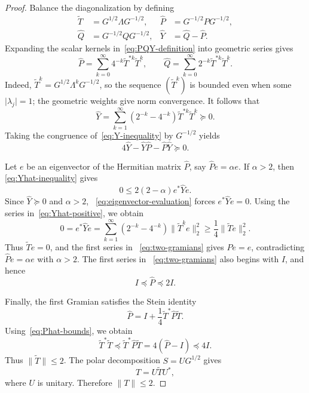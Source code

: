 \documentclass[preprints,article,submit,oneauthor]{Definitions/mdpi}
\theoremstyle{mdpi}
\theoremstyle{definition}
\begin{document}
\begin{proof}
Balance the diagonalization by defining
\begin{equation}
\begin{aligned}
  \widetilde T&=G^{1/2}\Lambda G^{-1/2},
  &\widehat P&=G^{-1/2}PG^{-1/2},\\
  \widehat Q&=G^{-1/2}QG^{-1/2},
  &\widehat Y&=\widehat Q-\widehat P.
\end{aligned}
\label{eq:balanced-definitions}
\end{equation}
Expanding the scalar kernels in~\eqref{eq:PQY-definition} into
geometric series gives
\begin{equation}
  \widehat P=\sum_{k=0}^{\infty}
  4^{-k}\widetilde T^{*k}\widetilde T^k,
  \qquad
  \widehat Q=\sum_{k=0}^{\infty}
  2^{-k}\widetilde T^{*k}\widetilde T^k.
  \label{eq:two-gramians}
\end{equation}
Indeed, $\widetilde T^k=G^{1/2}\Lambda^k G^{-1/2}$, so the sequence
$(\widetilde T^k)$ is bounded even when some
$\lvert\lambda_j\rvert=1$; the
geometric weights give norm convergence.  It follows that
\begin{equation}
  \widehat Y=
  \sum_{k=1}^{\infty}(2^{-k}-4^{-k})
  \widetilde T^{*k}\widetilde T^k\succeq0.
  \label{eq:Yhat-positive}
\end{equation}
Taking the congruence of~\eqref{eq:Y-inequality} by $G^{-1/2}$ yields
\begin{equation}
  4\widehat Y-\widehat Y\widehat P
  -\widehat P\widehat Y\succeq0.
  \label{eq:Yhat-inequality}
\end{equation}

Let $e$ be an eigenvector of the Hermitian matrix $\widehat P$, say
$\widehat Pe=\alpha e$.  If $\alpha>2$, then~%
\eqref{eq:Yhat-inequality} gives
\begin{equation}
  0\leq2(2-\alpha)e^*\widehat Ye.
  \label{eq:eigenvector-evaluation}
\end{equation}
Since $\widehat Y\succeq0$ and $\alpha>2$,~%
\eqref{eq:eigenvector-evaluation} forces $e^*\widehat Ye=0$.  Using the
series in~\eqref{eq:Yhat-positive}, we obtain
\[
  0=e^*\widehat Ye
  =\sum_{k=1}^{\infty}(2^{-k}-4^{-k})
    \lVert\widetilde T^k e\rVert_2^2
  \geq\frac14\lVert\widetilde Te\rVert_2^2.
\]
Thus $\widetilde Te=0$, and the first series in~%
\eqref{eq:two-gramians} gives $\widehat Pe=e$, contradicting
$\widehat Pe=\alpha e$ with $\alpha>2$.  The first series in~%
\eqref{eq:two-gramians} also begins with $I$, and hence
\begin{equation}
  I\preceq\widehat P\preceq2I.
  \label{eq:Phat-bounds}
\end{equation}

Finally, the first Gramian satisfies the Stein identity
\begin{equation}
  \widehat P
  =I+\frac14\widetilde T^*\widehat P\widetilde T.
  \label{eq:stein-identity}
\end{equation}
Using~\eqref{eq:Phat-bounds}, we obtain
\[
  \widetilde T^*\widetilde T
  \preceq \widetilde T^*\widehat P\widetilde T
  =4(\widehat P-I)\preceq4I.
\]
Thus $\lVert\widetilde T\rVert\leq2$.  The polar decomposition
$S=UG^{1/2}$ gives
\[
  T=U\widetilde TU^*,
\]
where $U$ is unitary.  Therefore $\lVert T\rVert\leq2$.
\end{proof}
\end{document}
